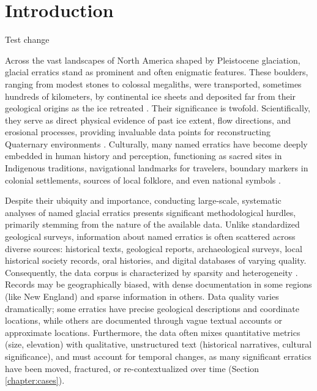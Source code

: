 \chapter{Introduction}
\label{chapter:intro}
Test change

Across the vast landscapes of North America shaped by Pleistocene glaciation, glacial erratics stand as prominent and often enigmatic features. These boulders, ranging from modest stones to colossal megaliths, were transported, sometimes hundreds of kilometers, by continental ice sheets and deposited far from their geological origins as the ice retreated \cite{Flint1971, Benn2010}. Their significance is twofold. Scientifically, they serve as direct physical evidence of past ice extent, flow directions, and erosional processes, providing invaluable data points for reconstructing Quaternary environments \cite{Cuffey2010}. Culturally, many named erratics have become deeply embedded in human history and perception, functioning as sacred sites in Indigenous traditions, navigational landmarks for travelers, boundary markers in colonial settlements, sources of local folklore, and even national symbols \cite{Seelye1997, Lenik2009, Dempsey1997}.

Despite their ubiquity and importance, conducting large-scale, systematic analyses of named glacial erratics presents significant methodological hurdles, primarily stemming from the nature of the available data. Unlike standardized geological surveys, information about named erratics is often scattered across diverse sources: historical texts, geological reports, archaeological surveys, local historical society records, oral histories, and digital databases of varying quality. Consequently, the data corpus is characterized by sparsity and heterogeneity \cite{Gregory2013}. Records may be geographically biased, with dense documentation in some regions (like New England) and sparse information in others. Data quality varies dramatically; some erratics have precise geological descriptions and coordinate locations, while others are documented through vague textual accounts or approximate locations. Furthermore, the data often mixes quantitative metrics (size, elevation) with qualitative, unstructured text (historical narratives, cultural significance), and must account for temporal changes, as many significant erratics have been moved, fractured, or re-contextualized over time (Section \ref{chapter:cases}).

